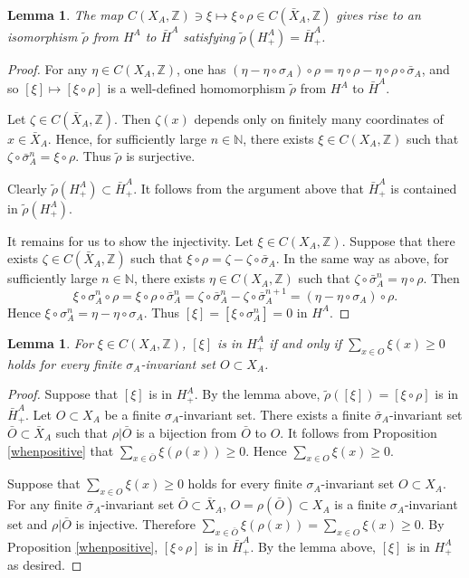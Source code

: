 \documentclass[11pt]{article}
\newtheorem{lemma}[theorem]{Lemma}
\theoremstyle{definition}
\numberwithin{equation}{section}
\newcommand{\N}{\mathbb{N}}
\newcommand{\Z}{\mathbb{Z}}
\begin{document}
\begin{lemma}\label{H=barH}
The map $C(X_A,\Z)\ni\xi\mapsto\xi\circ\rho\in C(\bar X_A,\Z)$ gives rise to 
an isomorphism $\tilde\rho$ from $H^A$ to $\bar H^A$ 
satisfying $\tilde\rho(H^A_+)=\bar H^A_+$. 
\end{lemma}
\begin{proof}
For any $\eta\in C(X_A,\Z)$, one has 
$(\eta-\eta\circ\sigma_A)\circ\rho
=\eta\circ\rho-\eta\circ\rho\circ\bar\sigma_A$, 
and so $[\xi]\mapsto[\xi\circ\rho]$ is a well-defined homomorphism 
$\tilde\rho$ from $H^A$ to $\bar H^A$. 

Let $\zeta\in C(\bar X_A,\Z)$. 
Then $\zeta(x)$ depends only on finitely many coordinates of $x\in\bar X_A$. 
Hence, for sufficiently large $n\in\N$, 
there exists $\xi\in C(X_A,\Z)$ 
such that $\zeta\circ\bar\sigma_A^n=\xi\circ\rho$. 
Thus $\tilde\rho$ is surjective. 

Clearly $\tilde\rho(H^A_+)\subset\bar H^A_+$. 
It follows from the argument above that 
$\bar H^A_+$ is contained in $\tilde\rho(H^A_+)$. 

It remains for us to show the injectivity. 
Let $\xi\in C(X_A,\Z)$. 
Suppose that there exists $\zeta\in C(\bar X_A,\Z)$ 
such that $\xi\circ\rho=\zeta-\zeta\circ\bar\sigma_A$. 
In the same way as above, for sufficiently large $n\in\N$, 
there exists $\eta\in C(X_A,\Z)$ 
such that $\zeta\circ\bar\sigma_A^n=\eta\circ\rho$. 
Then 
\[
\xi\circ\sigma_A^n\circ\rho=\xi\circ\rho\circ\bar\sigma_A^n
=\zeta\circ\bar\sigma_A^n-\zeta\circ\bar\sigma_A^{n+1}
=(\eta-\eta\circ\sigma_A)\circ\rho. 
\]
Hence $\xi\circ\sigma_A^n=\eta-\eta\circ\sigma_A$. 
Thus $[\xi]=[\xi\circ\sigma_A^n]=0$ in $H^A$. 
\end{proof}

\begin{lemma}\label{whenpositive2}
For $\xi\in C(X_A,\Z)$, 
$[\xi]$ is in $H^A_+$ if and only if 
$\sum_{x\in O}\xi(x)\geq0$ holds 
for every finite $\sigma_A$-invariant set $O\subset X_A$. 
\end{lemma}
\begin{proof}
Suppose that $[\xi]$ is in $H^A_+$. 
By the lemma above, $\tilde\rho([\xi])=[\xi\circ\rho]$ is in $\bar H^A_+$. 
Let $O\subset X_A$ be a finite $\sigma_A$-invariant set. 
There exists a finite $\bar\sigma_A$-invariant set $\bar O\subset\bar X_A$ 
such that $\rho|\bar O$ is a bijection from $\bar O$ to $O$. 
It follows from Proposition \ref{whenpositive} that 
$\sum_{x\in\bar O}\xi(\rho(x))\geq0$. 
Hence $\sum_{x\in O}\xi(x)\geq0$. 

Suppose that $\sum_{x\in O}\xi(x)\geq0$ holds 
for every finite $\sigma_A$-invariant set $O\subset X_A$. 
For any finite $\bar\sigma_A$-invariant set $\bar O\subset\bar X_A$, 
$O=\rho(\bar O)\subset X_A$ is a finite $\sigma_A$-invariant set and 
$\rho|\bar O$ is injective. 
Therefore $\sum_{x\in\bar O}\xi(\rho(x))=\sum_{x\in O}\xi(x)\geq0$. 
By Proposition \ref{whenpositive}, $[\xi\circ\rho]$ is in $\bar H^A_+$. 
By the lemma above, $[\xi]$ is in $H^A_+$ as desired. 
\end{proof}
\end{document}
